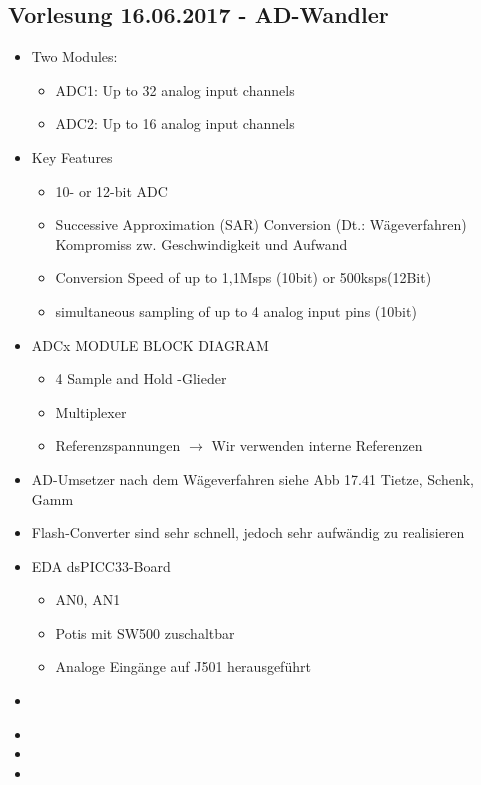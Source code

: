 \subsection{Vorlesung 16.06.2017 - AD-Wandler}
\begin{itemize}
	\item Two Modules:
	\begin{itemize}
		\item ADC1: Up to 32 analog input channels
		\item ADC2: Up to 16 analog input channels
	\end{itemize}
	\item Key Features
	\begin{itemize}
		\item 10- or 12-bit ADC
		\item Successive Approximation (SAR) Conversion (Dt.: Wägeverfahren)
		\subitem Kompromiss zw. Geschwindigkeit und Aufwand
		\item Conversion Speed of up to 1,1Msps (10bit) or 500ksps(12Bit)
		\item simultaneous sampling of up to 4 analog input pins (10bit)
	\end{itemize}
	\item ADCx MODULE BLOCK DIAGRAM
	\begin{itemize}
		\item 4 Sample and Hold -Glieder
		\item Multiplexer
		\item Referenzspannungen 
		\subitem $\rightarrow$ Wir verwenden interne Referenzen
	\end{itemize}
	\item AD-Umsetzer nach dem Wägeverfahren
	\subitem siehe Abb 17.41 Tietze, Schenk, Gamm
	\item Flash-Converter sind sehr schnell, jedoch sehr aufwändig zu realisieren
	\item EDA dsPICC33-Board
	\begin{itemize}
		\item AN0, AN1
		\item Potis mit SW500 zuschaltbar
		\item Analoge Eingänge auf J501 herausgeführt
	\end{itemize}
	\item
\end{itemize}

\begin{itemize}
	\item 
	\item
	\item
\end{itemize}
